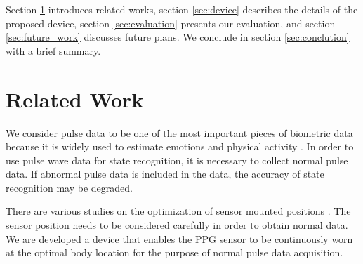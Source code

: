 \documentclass[sigconf, anonymous]{acmart}
\begin{document}

Section \ref{sec:related} introduces related works, section \ref{sec:device} describes the details of the proposed device, section \ref{sec:evaluation} presents our evaluation, and section \ref{sec:future_work} discusses future plans. We conclude in section \ref{sec:conclution} with a brief summary.



\section{Related Work}
\label{sec:related}
We consider pulse data to be one of the most important pieces of biometric data because it is widely used to estimate emotions and physical activity \cite{emotion_recognition_zhu, emotion_recognition_rinella, stress_detection, respiration_rate_estimation_selvakumar, respiratory_rate_estimation1, respiratory_rate_estimation2}.
In order to use pulse wave data for state recognition, it is necessary to collect normal pulse data. If abnormal pulse data is included in the data, the accuracy of state recognition may be degraded.\par

There are various studies on the optimization of sensor mounted positions \cite{sensor_placement_xu, sensor_placement_otim, sensor_placement_davoudi, sensor_placement_banos, sensor_placement_xia}.
The sensor position needs to be considered carefully in order to obtain normal data. We are developed a device that enables the PPG sensor to be continuously worn at the optimal body location for the purpose of normal pulse data acquisition.
\end{document}
